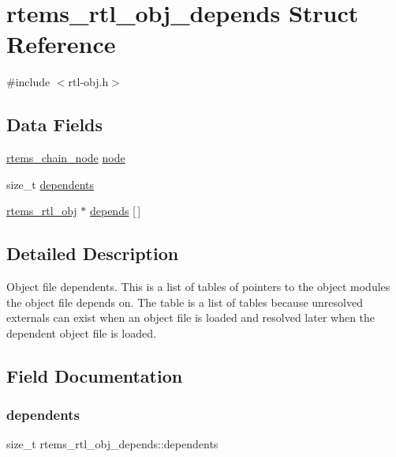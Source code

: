 \hypertarget{structrtems__rtl__obj__depends}{}\section{rtems\+\_\+rtl\+\_\+obj\+\_\+depends Struct Reference}
\label{structrtems__rtl__obj__depends}


{\ttfamily \#include $<$rtl-\/obj.\+h$>$}

\subsection*{Data Fields}
\begin{DoxyCompactItemize}
\item 
\mbox{\hyperlink{structChain__Node__struct}{rtems\+\_\+chain\+\_\+node}} \mbox{\hyperlink{structrtems__rtl__obj__depends_a06c2e61abfc88d63566c5df94cd73715}{node}}
\item 
size\+\_\+t \mbox{\hyperlink{structrtems__rtl__obj__depends_ac0c15f32cb0b9ad18b12bdc22dc218f3}{dependents}}
\item 
\mbox{\hyperlink{structrtems__rtl__obj}{rtems\+\_\+rtl\+\_\+obj}} $\ast$ \mbox{\hyperlink{structrtems__rtl__obj__depends_a602786c011f7727ff4cfc006ac892d32}{depends}} \mbox{[}$\,$\mbox{]}
\end{DoxyCompactItemize}


\subsection{Detailed Description}
Object file dependents. This is a list of tables of pointers to the object modules the object file depends on. The table is a list of tables because unresolved externals can exist when an object file is loaded and resolved later when the dependent object file is loaded. 

\subsection{Field Documentation}
\mbox{\label{structrtems__rtl__obj__depends_ac0c15f32cb0b9ad18b12bdc22dc218f3}} 
\subsubsection{\texorpdfstring{dependents}{dependents}}
{\footnotesize\ttfamily size\+\_\+t rtems\+\_\+rtl\+\_\+obj\+\_\+depends\+::dependents}


